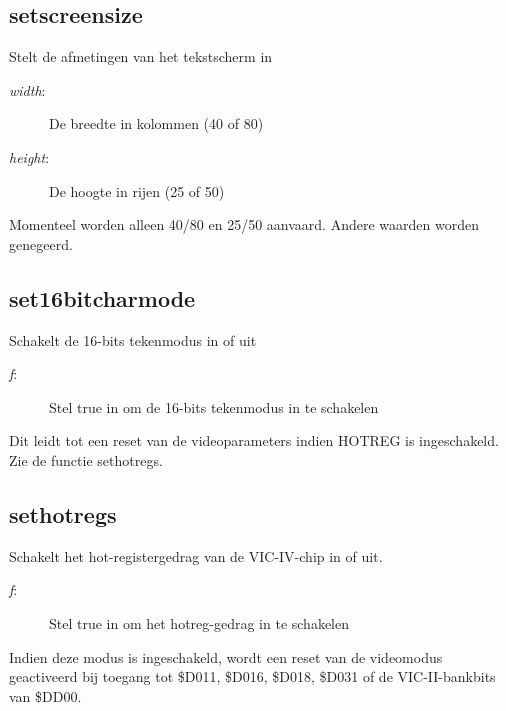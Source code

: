 \subsection{setscreensize}
\begin{description}[leftmargin=2.4cm,style=nextline]
\item [Beschrijving:] {Stelt de afmetingen van het tekstscherm in}\item [Syntaxis:] \item [Parameters:]
\begin{description}
\item [{\em width}:] {De breedte in kolommen (40 of 80)}\item [{\em height}:] {De hoogte in rijen (25 of 50)}
\end{description}
\item [Opmerkingen:] {Momenteel worden alleen 40/80 en 25/50 aanvaard. Andere waarden worden genegeerd.}
\end{description}

\subsection{set16bitcharmode}
\begin{description}[leftmargin=2.4cm,style=nextline]
\item [Beschrijving:] {Schakelt de 16-bits tekenmodus in of uit}\item [Syntaxis:] \item [Parameters:]
\begin{description}
\item [{\em f}:] {Stel true in om de 16-bits tekenmodus in te schakelen}
\end{description}
\item [Opmerkingen:] {Dit leidt tot een reset van de videoparameters indien HOTREG is   ingeschakeld. Zie de functie sethotregs.}
\end{description}

\subsection{sethotregs}
\begin{description}[leftmargin=2.4cm,style=nextline]
\item [Beschrijving:] {Schakelt het hot-registergedrag van de   VIC-IV-chip in of uit.}\item [Syntaxis:] \item [Parameters:]
\begin{description}
\item [{\em f}:] {Stel true in om het hotreg-gedrag in te schakelen}
\end{description}
\item [Opmerkingen:] {Indien deze modus is ingeschakeld, wordt een reset van de videomodus geactiveerd bij   toegang tot \$D011, \$D016, \$D018, \$D031 of de VIC-II-bankbits van   \$DD00. }
\end{description}

